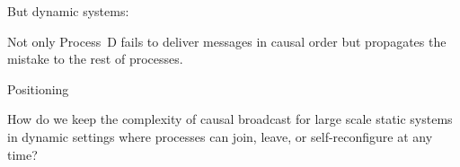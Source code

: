 \documentclass[10pt, xcolor={usenames, dvipsnames}]{beamer}
\newcommand{\xmark}{\ding{55}}
\newcommand{\NO}[1]{\textcolor{red}{#1}}
\begin{document}
\begin{frame}{But dynamic systems: \NO{\xmark}}
  \begin{center}
  \begin{minipage}{0.35\textwidth}
    \begin{center}
      
    \end{center}
  \end{minipage}
  \begin{minipage}{0.35\textwidth}
    \begin{center}
      
    \end{center}
  \end{minipage}
  \end{center}  

  Not only Process~D fails to deliver messages in causal order but propagates the
  mistake to the rest of processes.

\end{frame}


\begin{frame}{Positioning}
  
  \begin{center}
  \begin{table}
    \begin{center}
      \caption{\label{table:comparison} Complexity of causal
        broadcast protocols.
        $N$ is the number of processes that ever broadcast a message.
        $W$ is the number of received messages awaiting delivery.
        $P$ is the number of delivered messages that are temporarily kept before
        being safely purged to forbid double delivery.%
      }
      
    \end{center}
  \end{table}
  \end{center}

\end{frame}


\begin{frame}[standout]
  How do we keep the complexity of causal broadcast for large scale static
  systems in dynamic settings where processes can join, leave, or
  self-reconfigure at any time?
\end{frame}
\end{document}
